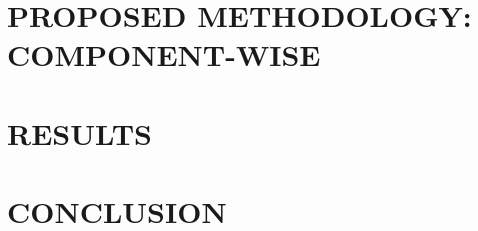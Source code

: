 \documentclass[Dual]{iitddiss}
\begin{document}


\chapter{PROPOSED METHODOLOGY: COMPONENT-WISE}
\label{chap:methodology}



\chapter{RESULTS}
\label{chap:results}



\chapter{CONCLUSION}
\label{chap:conclusion}








\begin{singlespace}
  
\end{singlespace}




\end{document}
